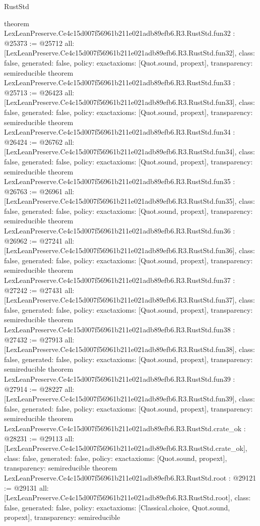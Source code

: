 \begin{lexlean}{RustStd}
\begin{coremodule}
{}
theorem LexLeanPreserve.Ce4c15d007f56961b211e021adb89efb6.R3.RustStd.fun32 : @25373 := @25712 {
  all: [LexLeanPreserve.Ce4c15d007f56961b211e021adb89efb6.R3.RustStd.fun32],
  class: false,
  generated: false,
  policy: exact{axioms: [Quot.sound, propext]},
  transparency: semireducible
}
theorem LexLeanPreserve.Ce4c15d007f56961b211e021adb89efb6.R3.RustStd.fun33 : @25713 := @26423 {
  all: [LexLeanPreserve.Ce4c15d007f56961b211e021adb89efb6.R3.RustStd.fun33],
  class: false,
  generated: false,
  policy: exact{axioms: [Quot.sound, propext]},
  transparency: semireducible
}
theorem LexLeanPreserve.Ce4c15d007f56961b211e021adb89efb6.R3.RustStd.fun34 : @26424 := @26762 {
  all: [LexLeanPreserve.Ce4c15d007f56961b211e021adb89efb6.R3.RustStd.fun34],
  class: false,
  generated: false,
  policy: exact{axioms: [Quot.sound, propext]},
  transparency: semireducible
}
theorem LexLeanPreserve.Ce4c15d007f56961b211e021adb89efb6.R3.RustStd.fun35 : @26763 := @26961 {
  all: [LexLeanPreserve.Ce4c15d007f56961b211e021adb89efb6.R3.RustStd.fun35],
  class: false,
  generated: false,
  policy: exact{axioms: [Quot.sound, propext]},
  transparency: semireducible
}
theorem LexLeanPreserve.Ce4c15d007f56961b211e021adb89efb6.R3.RustStd.fun36 : @26962 := @27241 {
  all: [LexLeanPreserve.Ce4c15d007f56961b211e021adb89efb6.R3.RustStd.fun36],
  class: false,
  generated: false,
  policy: exact{axioms: [Quot.sound, propext]},
  transparency: semireducible
}
theorem LexLeanPreserve.Ce4c15d007f56961b211e021adb89efb6.R3.RustStd.fun37 : @27242 := @27431 {
  all: [LexLeanPreserve.Ce4c15d007f56961b211e021adb89efb6.R3.RustStd.fun37],
  class: false,
  generated: false,
  policy: exact{axioms: [Quot.sound, propext]},
  transparency: semireducible
}
theorem LexLeanPreserve.Ce4c15d007f56961b211e021adb89efb6.R3.RustStd.fun38 : @27432 := @27913 {
  all: [LexLeanPreserve.Ce4c15d007f56961b211e021adb89efb6.R3.RustStd.fun38],
  class: false,
  generated: false,
  policy: exact{axioms: [Quot.sound, propext]},
  transparency: semireducible
}
theorem LexLeanPreserve.Ce4c15d007f56961b211e021adb89efb6.R3.RustStd.fun39 : @27914 := @28227 {
  all: [LexLeanPreserve.Ce4c15d007f56961b211e021adb89efb6.R3.RustStd.fun39],
  class: false,
  generated: false,
  policy: exact{axioms: [Quot.sound, propext]},
  transparency: semireducible
}
theorem LexLeanPreserve.Ce4c15d007f56961b211e021adb89efb6.R3.RustStd.crate_ok : @28231 := @29113 {
  all: [LexLeanPreserve.Ce4c15d007f56961b211e021adb89efb6.R3.RustStd.crate_ok],
  class: false,
  generated: false,
  policy: exact{axioms: [Quot.sound, propext]},
  transparency: semireducible
}
theorem LexLeanPreserve.Ce4c15d007f56961b211e021adb89efb6.R3.RustStd.root : @29121 := @29131 {
  all: [LexLeanPreserve.Ce4c15d007f56961b211e021adb89efb6.R3.RustStd.root],
  class: false,
  generated: false,
  policy: exact{axioms: [Classical.choice, Quot.sound, propext]},
  transparency: semireducible
}


\end{coremodule}
\end{lexlean}
